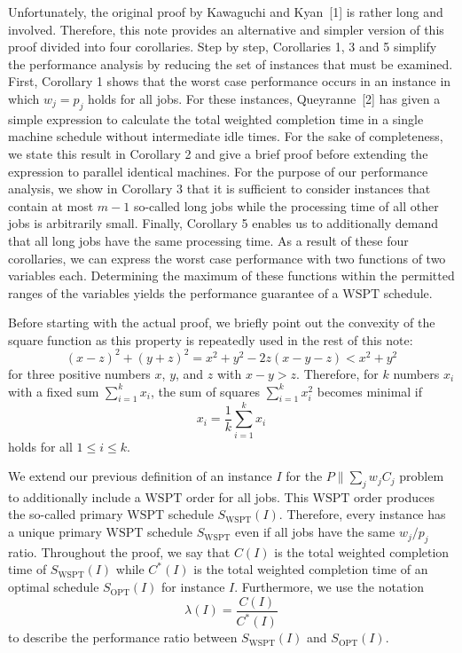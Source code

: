 \documentclass[11pt]{article}
\newcommand{\WSPT}{\mathrm{WSPT}}
\newcommand{\OPT}{\mathrm{OPT}}
\begin{document}
Unfortunately, the original proof by Kawaguchi and Kyan~[1] is rather long
and involved. Therefore, this note provides an alternative and simpler
version of this proof divided into four corollaries. Step by step,
Corollaries 1, 3 and 5 simplify the performance analysis by reducing the set
of instances that must be examined. First, Corollary 1 shows that the worst
case performance occurs in an instance in which $w_j=p_j$ holds for all jobs.
For these instances, Queyranne~[2] has given a simple expression to calculate
the total weighted completion time in a single machine schedule without
intermediate idle times. For the sake of completeness, we state this result
in Corollary 2 and give a brief proof before extending the expression to
parallel identical machines. For the purpose of our performance analysis, we
show in Corollary 3 that it is sufficient to consider instances that contain
at most $m-1$ so-called long jobs while the processing time of all other jobs
is arbitrarily small. Finally, Corollary 5 enables us to additionally demand
that all long jobs have the same processing time. As a result of these four
corollaries, we can express the worst case performance with two functions of
two variables each. Determining the maximum of these functions within the
permitted ranges of the variables yields the performance guarantee of a \(\mathrm{WSPT}\)
schedule.

Before starting with the actual proof, we briefly point out the convexity of
the square function as this property is repeatedly used in the rest of this
note:
\[
        (x-z)^2+(y+z)^2
        =
        x^2+y^2-2z(x-y-z)
        <
        x^2+y^2
\]
for three positive numbers $x$, $y$, and $z$ with $x-y>z$. Therefore, for
$k$ numbers $x_i$ with a fixed sum $\sum_{i=1}^k x_i$, the sum of squares
$\sum_{i=1}^k x_i^2$ becomes minimal if
\[
        x_i=\frac1k\sum_{i=1}^k x_i
\]
holds for all $1\leq i\leq k$.

We extend our previous definition of an instance $I$ for the
$P\|\sum_j w_j C_j$ problem to additionally include a \(\mathrm{WSPT}\) order for all
jobs. This \(\mathrm{WSPT}\) order produces the so-called primary \(\mathrm{WSPT}\) schedule
$S_{\WSPT}(I)$. Therefore, every instance has a unique primary \(\mathrm{WSPT}\) schedule
$S_{\WSPT}$ even if all jobs have the same $w_j/p_j$ ratio. Throughout the
proof, we say that $C(I)$ is the total weighted completion time of
$S_{\WSPT}(I)$ while $C^*(I)$ is the total weighted completion time of an
optimal schedule $S_{\OPT}(I)$ for instance $I$. Furthermore, we use the
notation
\[
        \lambda(I)=\frac{C(I)}{C^*(I)}
\]
to describe the performance ratio between $S_{\WSPT}(I)$ and $S_{\OPT}(I)$.
\end{document}
